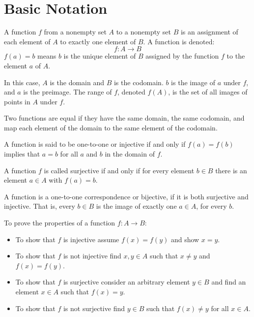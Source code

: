 \section{Basic Notation}
A function \(f\) from a nonempty set \(A\) to a nonempty set \(B\) is an assignment of each element of \(A\) to exactly one element of \(B\). A function is denoted:
\begin{equation*}
    f: A \rightarrow B
\end{equation*}
\(f(a) = b\) means \(b\) is the unique element of \(B\) assigned by the function \(f\) to the element \(a\) of \(A\).

In this case, \(A\) is the domain and \(B\) is the codomain. \(b\) is the image of \(a\) under \(f\), and \(a\) is the preimage. The range of \(f\), denoted \(f(A)\), is the set of all images of points in \(A\) under \(f\).

Two functions are equal if they have the same domain, the same codomain, and map each element of the domain to the same element of the codomain.

A function is said to be one-to-one or injective if and only if \(f(a) = f(b)\) implies that \(a = b\) for all \(a\) and \(b\) in the domain of \(f\).

A function \(f\) is called surjective if and only if for every element \(b \in B\) there is an element \(a \in A\) with \(f(a) = b\).

A function is a one-to-one correspondence or bijective, if it is both surjective and injective. That is, every \(b \in B\) is the image of exactly one \(a \in A\), for every \(b\).

To prove the properties of a function \(f: A \rightarrow B\):
\begin{itemize}
    \item To show that \(f\) is injective assume \(f(x) = f(y)\) and show \(x = y\).
    \item To show that \(f\) is not injective find \(x, y \in A\) such that \(x \neq y\) and \(f(x) = f(y)\).
    \item To show that \(f\) is surjective consider an arbitrary element \(y \in B\) and find an element \(x \in A\) such that \(f(x) = y\).
    \item To show that \(f\) is not surjective find \(y \in B\) such that \(f(x) \neq y\) for all \(x \in A\).
\end{itemize}
